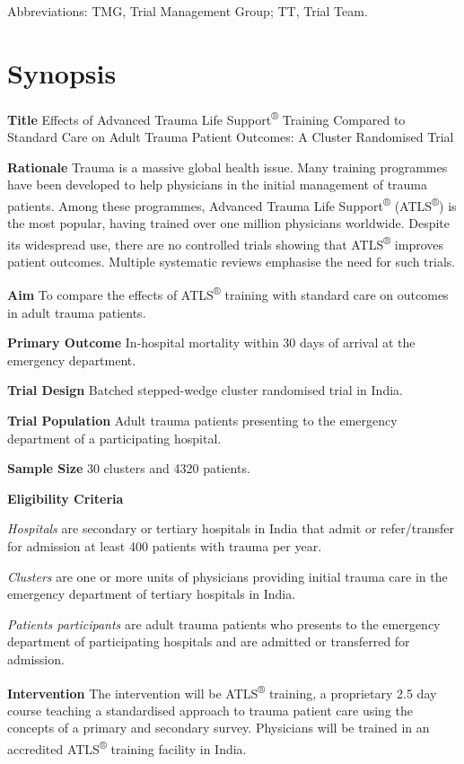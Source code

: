 \documentclass[
]{scrartcl}
\begin{document}
Abbreviations: TMG, Trial Management Group; TT, Trial Team.

\newpage{}

\hypertarget{synopsis}{%
\section{Synopsis}\label{synopsis}}

\textbf{Title} Effects of Advanced Trauma Life
Support\textsuperscript{®} Training Compared to Standard Care on Adult
Trauma Patient Outcomes: A Cluster Randomised Trial

\textbf{Rationale} Trauma is a massive global health issue. Many
training programmes have been developed to help physicians in the
initial management of trauma patients. Among these programmes, Advanced
Trauma Life Support\textsuperscript{®} (ATLS\textsuperscript{®}) is the
most popular, having trained over one million physicians worldwide.
Despite its widespread use, there are no controlled trials showing that
ATLS\textsuperscript{®} improves patient outcomes. Multiple systematic
reviews emphasise the need for such trials.

\textbf{Aim} To compare the effects of ATLS\textsuperscript{®} training
with standard care on outcomes in adult trauma patients.

\textbf{Primary Outcome} In-hospital mortality within 30 days of arrival
at the emergency department.

\textbf{Trial Design} Batched stepped-wedge cluster randomised trial in
India.

\textbf{Trial Population} Adult trauma patients presenting to the
emergency department of a participating hospital.

\textbf{Sample Size} 30 clusters and 4320 patients.

\textbf{Eligibility Criteria}

\emph{Hospitals} are secondary or tertiary hospitals in India that admit
or refer/transfer for admission at least 400 patients with trauma per
year.

\emph{Clusters} are one or more units of physicians providing initial
trauma care in the emergency department of tertiary hospitals in India.

\emph{Patients participants} are adult trauma patients who presents to
the emergency department of participating hospitals and are admitted or
transferred for admission.

\textbf{Intervention} The intervention will be ATLS\textsuperscript{®}
training, a proprietary 2.5 day course teaching a standardised approach
to trauma patient care using the concepts of a primary and secondary
survey. Physicians will be trained in an accredited
ATLS\textsuperscript{®} training facility in India.
\end{document}
